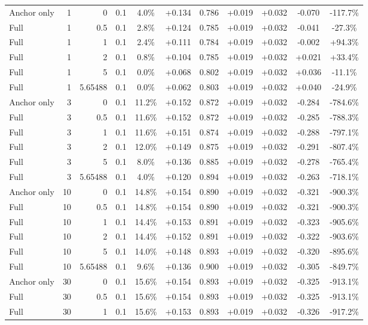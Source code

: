 \begin{table}[htbp]
\begin{tabular}{lrrrccccccc}
Anchor only & 1 & 0 & 0.1 & 4.0\% & +0.134 & 0.786 & +0.019 & +0.032 & -0.070 & -117.7\% \\
Full & 1 & 0.5 & 0.1 & 2.8\% & +0.124 & 0.785 & +0.019 & +0.032 & -0.041 & -27.3\% \\
Full & 1 & 1 & 0.1 & 2.4\% & +0.111 & 0.784 & +0.019 & +0.032 & -0.002 & +94.3\% \\
Full & 1 & 2 & 0.1 & 0.8\% & +0.104 & 0.785 & +0.019 & +0.032 & +0.021 & +33.4\% \\
Full & 1 & 5 & 0.1 & 0.0\% & +0.068 & 0.802 & +0.019 & +0.032 & +0.036 & -11.1\% \\
Full & 1 & 5.65488 & 0.1 & 0.0\% & +0.062 & 0.803 & +0.019 & +0.032 & +0.040 & -24.9\% \\
Anchor only & 3 & 0 & 0.1 & 11.2\% & +0.152 & 0.872 & +0.019 & +0.032 & -0.284 & -784.6\% \\
Full & 3 & 0.5 & 0.1 & 11.6\% & +0.152 & 0.872 & +0.019 & +0.032 & -0.285 & -788.3\% \\
Full & 3 & 1 & 0.1 & 11.6\% & +0.151 & 0.874 & +0.019 & +0.032 & -0.288 & -797.1\% \\
Full & 3 & 2 & 0.1 & 12.0\% & +0.149 & 0.875 & +0.019 & +0.032 & -0.291 & -807.4\% \\
Full & 3 & 5 & 0.1 & 8.0\% & +0.136 & 0.885 & +0.019 & +0.032 & -0.278 & -765.4\% \\
Full & 3 & 5.65488 & 0.1 & 4.0\% & +0.120 & 0.894 & +0.019 & +0.032 & -0.263 & -718.1\% \\
Anchor only & 10 & 0 & 0.1 & 14.8\% & +0.154 & 0.890 & +0.019 & +0.032 & -0.321 & -900.3\% \\
Full & 10 & 0.5 & 0.1 & 14.8\% & +0.154 & 0.890 & +0.019 & +0.032 & -0.321 & -900.3\% \\
Full & 10 & 1 & 0.1 & 14.4\% & +0.153 & 0.891 & +0.019 & +0.032 & -0.323 & -905.6\% \\
Full & 10 & 2 & 0.1 & 14.4\% & +0.152 & 0.891 & +0.019 & +0.032 & -0.322 & -903.6\% \\
Full & 10 & 5 & 0.1 & 14.0\% & +0.148 & 0.893 & +0.019 & +0.032 & -0.320 & -895.6\% \\
Full & 10 & 5.65488 & 0.1 & 9.6\% & +0.136 & 0.900 & +0.019 & +0.032 & -0.305 & -849.7\% \\
Anchor only & 30 & 0 & 0.1 & 15.6\% & +0.154 & 0.893 & +0.019 & +0.032 & -0.325 & -913.1\% \\
Full & 30 & 0.5 & 0.1 & 15.6\% & +0.154 & 0.893 & +0.019 & +0.032 & -0.325 & -913.1\% \\
Full & 30 & 1 & 0.1 & 15.6\% & +0.153 & 0.893 & +0.019 & +0.032 & -0.326 & -917.2\% \\

\end{tabular}
\end{table}

